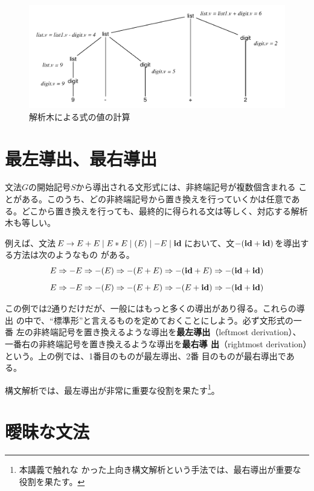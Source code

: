 \begin{figure}
 \begin{center}
  \includegraphics[width=12cm]{figure/parse_tree_appl.pdf}
 \end{center}
 \caption{解析木による式の値の計算}
 \label{190545_30Mar06}
\end{figure}

\section{最左導出、最右導出}

文法$G$の開始記号$S$から導出される文形式には、非終端記号が複数個含まれる
ことがある。このうち、どの非終端記号から置き換えを行っていくかは任意であ
る。どこから置き換えを行っても、最終的に得られる文は等しく、対応する解析
木も等しい。

例えば、文法$E \rightarrow E + E \mid E * E \mid (E) \mid -E \mid {\bf
id}$において、文$-({\bf id}+{\bf id})$を導出する方法は次のようなもの
がある。
\[
 E \Rightarrow -E \Rightarrow -(E) \Rightarrow -(E+E) \Rightarrow
  -({\bf id}+E) \Rightarrow -({\bf id}+{\bf id})
\]
\[
 E \Rightarrow -E \Rightarrow -(E) \Rightarrow -(E+E) \Rightarrow
  -(E+{\bf id}) \Rightarrow -({\bf id}+{\bf id})
\]

この例では2通りだけだが、一般にはもっと多くの導出があり得る。これらの導出
の中で、``標準形''と言えるものを定めておくことにしよう。必ず文形式の一番
左の非終端記号を置き換えるような導出を{\bfseries 最左導出}（leftmost
derivation）、一番右の非終端記号を置き換えるような導出を{\bfseries 最右導
出}（rightmost derivation）という。上の例では、1番目のものが最左導出、2番
目のものが最右導出である。

構文解析では、最左導出が非常に重要な役割を果たす\footnote{本講義で触れな
かった上向き構文解析という手法では、最右導出が重要な役割を果たす。}。

\section{曖昧な文法}
\label{121131_31Mar06}

